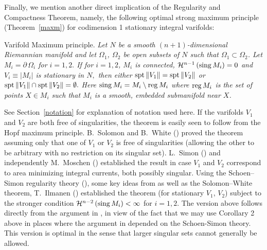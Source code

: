 \documentclass[a4paper,11pt]{amsart}
\begin{document}

Finally, we mention another direct implication of the Regularity and Compactness Theorem, namely, the following optimal strong maximum principle (Theorem~\ref{maxm}) for codimension 1 stationary integral varifolds:

\smallskip

\noindent
{\sc Varifold Maximum principle}. \emph{Let $N$ be a smooth $(n+1)$-dimensional Riemannian manifold and 
let $\Omega_{1}$, $\Omega_{2}$ be open subsets of $N$ such that $\Omega_{1} \subset \Omega_{2}$. Let
$M_{i} = \partial \, \Omega_{i}$ for $i=1, 2.$ If for $i=1, 2$, $M_{i}$ is connected,  ${\mathcal H}^{n-1} \, ({\rm sing} \, M_{i} ) = 0$ and $V_{i} \equiv |M_{i}|$ is stationary in $N,$ then either ${\rm spt} \, \|V_{1}\|  = {\rm spt} \, \|V_{2}\| $ or ${\rm spt} \, \|V_{1}\| \cap {\rm spt} \, \|V_{2}\|  = \emptyset.$ 
Here ${\rm sing} \, M_{i} = M_{i} \setminus {\rm reg} \, M_{i}$ where ${\rm reg} \, M_{i}$ is the set of points $X \in M_{i}$ such that $M_{i}$ is a smooth, embedded submanifold near $X$.} 


\noindent
See Section~\ref{notation} for explanation of notation used here. If the varifolds $V_{1}$ and $V_{2}$ are both free of singularities, the theorem is easily seen to follow from the Hopf maximum principle. B.~Solomon and B.~White (\cite{SoW}) proved the theorem assuming only that one of $V_{1}$ or $V_{2}$ is free of singularities (allowing the other to be arbitrary with no restriction on its singular set). L.~Simon (\cite{S4}) and independently M.~Moschen (\cite{Mo}) established the result in case $V_{1}$ and $V_{2}$ correspond to area minimizing  integral currents, both possibly singular. Using  the Schoen--Simon regularity theory (\cite{SS}), some key ideas from \cite{S4} as well as 
the Solomon--White theorem, T.~Ilmanen (\cite{I}) established the theorem (for stationary $V_{1}$, $V_{2}$) subject to the stronger condition ${\mathcal H}^{n-2} \, ({\rm sing} \, M_{i}) < \infty$ for $i=1, 2$. The version above follows directly from the argument in \cite{I}, in view of the fact that we may use Corollary 2 above in places where the argument in \cite{I} depended on the Schoen-Simon theory. This version is optimal in the sense that larger singular sets cannot generally be allowed.
\end{document}
